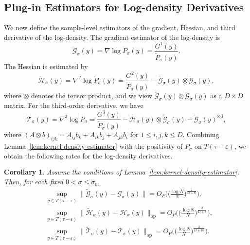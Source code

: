 \documentclass[11pt]{article}
\theoremstyle{plain}
\newtheorem{corollary}[theorem]{Corollary}
\theoremstyle{definition}
\begin{document}
\subsection{Plug-in Estimators for Log-density Derivatives}
We now define the sample-level estimators of the gradient, Hessian, and third derivative of the log-density. The gradient estimator of the log-density is
\[
\widetilde{\mathcal G}_\sigma(y) = \nabla \log\widetilde{P}_\sigma(y) =\frac{G^1(y)}{\widetilde{P}_\sigma(y)}.
\]
The Hessian is estimated by 
\[
\widetilde{\mathcal{H}}_\sigma(y) = \nabla^2 \log\widetilde{P}_\sigma(y)= \frac{ G^2(y) }{ \widetilde{P}_\sigma(y) } - \widetilde{\mathcal G}_\sigma(y) \otimes \widetilde{\mathcal G}_\sigma(y),
\]
where $\otimes$ denotes the tensor product, and we view $\widetilde{\mathcal G}_\sigma(y) \otimes \widetilde{\mathcal G}_\sigma(y)$ as a $D\times D$ matrix. For the third-order derivative, we have
\[
\widetilde{\mathcal T}_\sigma(y)= \nabla^3\log \widetilde P_\sigma 
= \frac{G^3(y)}{\widetilde{P}_\sigma(y) } - \widetilde{\mathcal{H}}_\sigma(y)\otimes \widetilde{\mathcal G}_\sigma(y) - \widetilde{\mathcal G}_\sigma(y)^{\otimes3},
\]
where $(A\otimes b)_{ijk} = A_{ij}b_k + A_{ik}b_j + A_{jk}b_i$ for $1\le i,j,k\le D$. Combining Lemma~\ref{lem:kernel-density-estimator} with the positivity of $P_\sigma$ on $T(\tau-\varepsilon)$, we obtain the following rates for the log-density derivatives.
\begin{corollary}\label{co:rates-for-log-density-derivatives}
Assume the conditions of Lemma~\ref{lem:kernel-density-estimator}. Then, for each fixed $0<\sigma\le\sigma_0$,
    \begin{align}
           & \sup_{y\in T(\tau-\varepsilon)}\|\widetilde{\mathcal G}_\sigma(y) - \mathcal G_\sigma(y)\| = O_P\big(\big(\frac{\log N}{N}\big)^{\frac{2}{D+6}}\big),\\
            & \sup_{y\in T(\tau-\varepsilon)}\|\widetilde{\mathcal{H}}_\sigma(y)-\mathcal{H}_\sigma(y)\|_{\mathrm{op}} = O_P\big(\big(\frac{\log N}{N}\big)^{\frac{2}{D+8}}\big),\\
            & \sup_{y\in T(\tau-\varepsilon)}\|\widetilde{\mathcal T}_\sigma(y) - {\mathcal T}_\sigma(y)\|_{\mathrm{op}} = O_P\big(\big(\frac{\log N}{N}\big)^{\frac{2}{D+10}}\big).
    \end{align}
\end{corollary}
\end{document}
